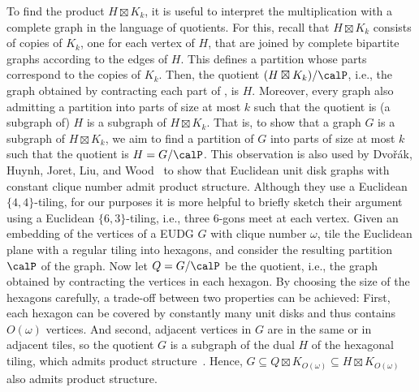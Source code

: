 %
To find the product $ H \boxtimes K_k $, it is useful to interpret the multiplication with a complete graph in the language of quotients.
For this, recall that $ H \boxtimes K_k $ consists of copies of $ K_k $, one for each vertex of $ H $, that are joined by complete bipartite graphs according to the edges of $ H $.
This defines a partition \calP whose parts correspond to the copies of $ K_k $.
Then, the quotient $ (H \boxtimes K_k) / \calP $, i.e., the graph obtained by contracting each part of \calP, is $ H $.
Moreover, every graph also admitting a partition into parts of size at most $ k $ such that the quotient is (a subgraph of) $ H $ is a subgraph of $ H \boxtimes K_k $.
That is, to show that a graph $ G $ is a subgraph of $ H \boxtimes K_k $, we aim to find a partition \calP of $ G $ into parts of size at most $ k $ such that the quotient is $ H = G / \calP $.
%
This observation is also used by Dvořák, Huynh, Joret, Liu, and Wood~\cite{dvorak_notes_2021} to show that Euclidean unit disk graphs with constant clique number admit product structure.
Although they use a Euclidean $ \{ 4, 4 \} $-tiling, for our purposes it is more helpful to briefly sketch their argument using a Euclidean $ \{ 6, 3 \} $-tiling, i.e., three 6-gons meet at each vertex.
%
Given an embedding of the vertices of a EUDG $G$ with clique number $ \omega $, tile the Euclidean plane with a regular tiling into hexagons, and consider the resulting partition $\calP$ of the graph.
Now let $ Q = G / \calP $ be the quotient, i.e., the graph obtained by contracting the vertices in each hexagon.
By choosing the size of the hexagons carefully, a trade-off between two properties can be achieved: 
First, each hexagon can be covered by constantly many unit disks and thus contains $ O(\omega) $ vertices.
And second, adjacent vertices in $ G $ are in the same or in adjacent tiles, so the quotient $ G $ is a subgraph of the dual $ H $ of the hexagonal tiling, which admits product structure~\cite{dujmovic_planar_2019}.
Hence, $ G \subseteq Q \boxtimes K_{O(\omega)} \subseteq H \boxtimes K_{O(\omega)} $ also admits product structure.
